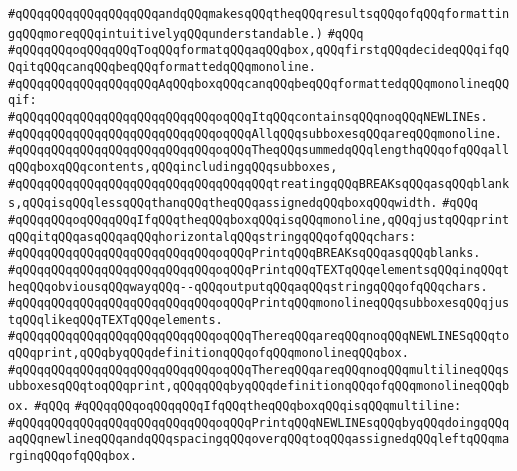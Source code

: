 \verb|#qQQqqQQqqQQqqQQqqQQqandqQQqmakesqQQqtheqQQqresultsqQQqofqQQqformattingqQQqmoreqQQqintuitivelyqQQqunderstandable.)|\newline
\verb|#qQQq|\newline
\verb|#qQQqqQQqoqQQqqQQqToqQQqformatqQQqaqQQqbox,qQQqfirstqQQqdecideqQQqifqQQqitqQQqcanqQQqbeqQQqformattedqQQqmonoline.|\newline
\verb|#qQQqqQQqqQQqqQQqqQQqAqQQqboxqQQqcanqQQqbeqQQqformattedqQQqmonolineqQQqif:|\newline
\verb|#qQQqqQQqqQQqqQQqqQQqqQQqqQQqoqQQqItqQQqcontainsqQQqnoqQQqNEWLINEs.|\newline
\verb|#qQQqqQQqqQQqqQQqqQQqqQQqqQQqoqQQqAllqQQqsubboxesqQQqareqQQqmonoline.|\newline
\verb|#qQQqqQQqqQQqqQQqqQQqqQQqqQQqoqQQqTheqQQqsummedqQQqlengthqQQqofqQQqallqQQqboxqQQqcontents,qQQqincludingqQQqsubboxes,|\newline
\verb|#qQQqqQQqqQQqqQQqqQQqqQQqqQQqqQQqqQQqtreatingqQQqBREAKsqQQqasqQQqblanks,qQQqisqQQqlessqQQqthanqQQqtheqQQqassignedqQQqboxqQQqwidth.|\newline
\verb|#qQQq|\newline
\verb|#qQQqqQQqoqQQqqQQqIfqQQqtheqQQqboxqQQqisqQQqmonoline,qQQqjustqQQqprintqQQqitqQQqasqQQqaqQQqhorizontalqQQqstringqQQqofqQQqchars:|\newline
\verb|#qQQqqQQqqQQqqQQqqQQqqQQqqQQqoqQQqPrintqQQqBREAKsqQQqasqQQqblanks.|\newline
\verb|#qQQqqQQqqQQqqQQqqQQqqQQqqQQqoqQQqPrintqQQqTEXTqQQqelementsqQQqinqQQqtheqQQqobviousqQQqwayqQQq--qQQqoutputqQQqaqQQqstringqQQqofqQQqchars.|\newline
\verb|#qQQqqQQqqQQqqQQqqQQqqQQqqQQqoqQQqPrintqQQqmonolineqQQqsubboxesqQQqjustqQQqlikeqQQqTEXTqQQqelements.|\newline
\verb|#qQQqqQQqqQQqqQQqqQQqqQQqqQQqoqQQqThereqQQqareqQQqnoqQQqNEWLINESqQQqtoqQQqprint,qQQqbyqQQqdefinitionqQQqofqQQqmonolineqQQqbox.|\newline
\verb|#qQQqqQQqqQQqqQQqqQQqqQQqqQQqoqQQqThereqQQqareqQQqnoqQQqmultilineqQQqsubboxesqQQqtoqQQqprint,qQQqqQQqbyqQQqdefinitionqQQqofqQQqmonolineqQQqbox.|\newline
\verb|#qQQq|\newline
\verb|#qQQqqQQqoqQQqqQQqIfqQQqtheqQQqboxqQQqisqQQqmultiline:|\newline
\verb|#qQQqqQQqqQQqqQQqqQQqqQQqqQQqoqQQqPrintqQQqNEWLINEsqQQqbyqQQqdoingqQQqaqQQqnewlineqQQqandqQQqspacingqQQqoverqQQqtoqQQqassignedqQQqleftqQQqmarginqQQqofqQQqbox.|\newline
